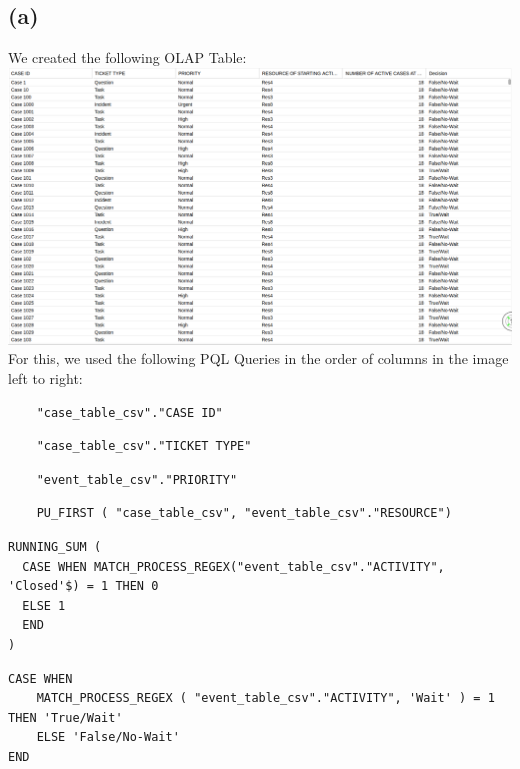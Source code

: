 \documentclass[../../main.tex]{subfiles}
\begin{document}
\subsection*{(a)}
We created the following OLAP Table:\\
\includegraphics[width=\columnwidth]{img/Celonis_a_OLAP_Table.png}\\
For this, we used the following PQL Queries in the order of columns in the image left to right:
\begin{verbatim}
	"case_table_csv"."CASE ID"
\end{verbatim}
\begin{verbatim}
	"case_table_csv"."TICKET TYPE"
\end{verbatim}
\begin{verbatim}
	"event_table_csv"."PRIORITY"
\end{verbatim}
\begin{verbatim}
	PU_FIRST ( "case_table_csv", "event_table_csv"."RESOURCE")
\end{verbatim}
\begin{verbatim}
RUNNING_SUM (
  CASE WHEN MATCH_PROCESS_REGEX("event_table_csv"."ACTIVITY", 'Closed'$) = 1 THEN 0
  ELSE 1
  END
)
\end{verbatim}
\begin{verbatim}
CASE WHEN
	MATCH_PROCESS_REGEX ( "event_table_csv"."ACTIVITY", 'Wait' ) = 1 THEN 'True/Wait'
	ELSE 'False/No-Wait'
END
\end{verbatim}
\end{document}
